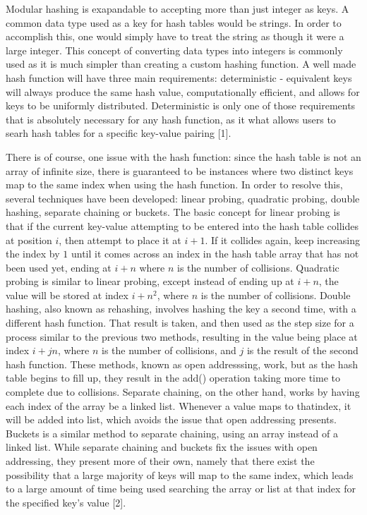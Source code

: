 \documentclass[conference]{IEEEtran}
\begin{document}
Modular hashing is exapandable to accepting more than just integer as keys. A common data type used as a key for hash tables would be strings.
In order to accomplish this, one would simply have to treat the string as though it were a large integer. This concept of converting data types into
integers is commonly used as it is much simpler than creating a custom hashing function. A well made hash function will have three main requirements:
deterministic - equivalent keys will always produce the same hash value, computationally efficient, and allows for keys to be uniformly distributed.
Deterministic is only one of those requirements that is absolutely necessary for any hash function, as it what allows users to searh hash tables
for a specific key-value pairing [1].

There is of course, one issue with the hash function: since the hash table is not an array of infinite size, there is guaranteed to be instances where
two distinct keys map to the same index when using the hash function. In order to resolve this, several techniques have been developed: linear probing,
quadratic probing, double hashing, separate chaining or buckets. The basic concept for linear probing is that if the current key-value attempting to be
entered into the hash table collides at position $i$, then attempt to place it at $i+1$. If it collides again, keep increasing the index by $1$ until
it comes across an index in the hash table array that has not been used yet, ending at $i+n$ where $n$ is the number of collisions. Quadratic probing is
similar to linear probing, except instead of ending up at $i+n$, the value will be stored at index $i+n^2$, where $n$ is the number of collisions.
Double hashing, also known as rehashing, involves hashing the key a second time, with a different hash function. That result is taken, and then used as
the step size for a process similar to the previous two methods, resulting in the value being place at index $i+jn$, where $n$ is the number of collisions,
and $j$ is the result of the second hash function. These methods, known as open addresssing, work, but as the hash table begins to fill up, they result in the 
add() operation taking more time to complete due to collisions. Separate chaining, on the other hand, works by having each index of the array be a linked list. 
Whenever a value maps to thatindex, it will be added into list, which avoids the issue that open addressing presents. Buckets is a similar method to 
separate chaining, using an array instead of a linked list. While separate chaining and buckets fix the issues with open addressing, they present more
of their own, namely that there exist the possibility that a large majority of keys will map to the same index, which leads to a large amount of time
being used searching the array or list at that index for the specified key's value [2].
\end{document}
